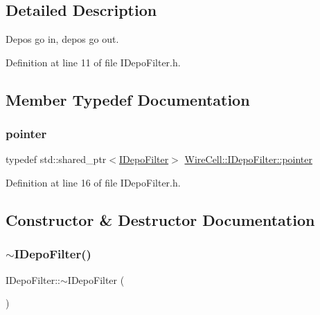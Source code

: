 \subsection{Detailed Description}
Depos go in, depos go out. 

Definition at line 11 of file I\+Depo\+Filter.\+h.



\subsection{Member Typedef Documentation}
\mbox{\label{class_wire_cell_1_1_i_depo_filter_aef40b27718702971536c72b9b02b943b}} 
\subsubsection{\texorpdfstring{pointer}{pointer}}
{\footnotesize\ttfamily typedef std\+::shared\+\_\+ptr$<$\hyperlink{class_wire_cell_1_1_i_depo_filter}{I\+Depo\+Filter}$>$ \hyperlink{class_wire_cell_1_1_i_depo_filter_aef40b27718702971536c72b9b02b943b}{Wire\+Cell\+::\+I\+Depo\+Filter\+::pointer}}



Definition at line 16 of file I\+Depo\+Filter.\+h.



\subsection{Constructor \& Destructor Documentation}
\mbox{\label{class_wire_cell_1_1_i_depo_filter_aa33c0efb0774424d1020625cf757c2a2}} 
\subsubsection{\texorpdfstring{$\sim$\+I\+Depo\+Filter()}{~IDepoFilter()}}
{\footnotesize\ttfamily I\+Depo\+Filter\+::$\sim$\+I\+Depo\+Filter (\begin{DoxyParamCaption}{ }\end{DoxyParamCaption})\hspace{0.3cm}{\ttfamily [virtual]}}



